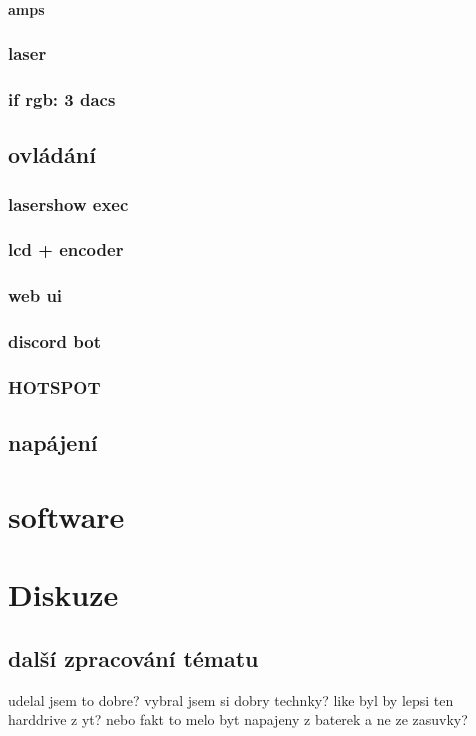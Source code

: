 \documentclass{template/socthesis}
\begin{document}
\subsubsection{amps}

\subsection{laser}
\subsection{if rgb: 3 dacs}


\section{ovládání}
\subsection{lasershow exec}
\subsection{lcd + encoder}
\subsection{web ui}
\subsection{discord bot}
\subsection{HOTSPOT}

\section{napájení}

\chapter{software}

\chapter{Diskuze}
\section{další zpracování tématu}
udelal jsem to dobre? vybral jsem si dobry technky?
like byl by lepsi ten harddrive z yt?
nebo fakt to melo byt napajeny z baterek a ne ze zasuvky?
\end{document}
